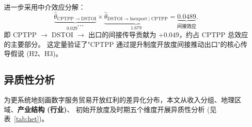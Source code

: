 \documentclass[11pt,a4paper]{article}
\begin{document}
进一步采用中介效应分解：
\[
\underbrace{\hat\theta_{\mathrm{CPTPP}\to\mathrm{DSTOI}}}_{0.029^{***}}
\times
\underbrace{\hat\theta_{\mathrm{DSTOI}\to\mathrm{lnexport}\mid\mathrm{CPTPP}}}_{1.679}
=
\underbrace{0.0489}_{\text{间接效应}}.
\]
即 CPTPP $\to$ DSTOI $\to$ 出口的间接传导贡献为 $+0.049$，约占 CPTPP 总效应的主要部分。
这定量验证了"CPTPP 通过提升制度开放度间接推动出口"的核心传导假说 (H2、H3)。

\subsection{异质性分析}

为更系统地刻画数字服务贸易开放红利的差异化分布，本文从收入分组、地理区域、\textbf{产业结构 (行业)}、
初始开放度及时期五个维度开展异质性分析 (见表~\ref{tab:het})。
\end{document}
